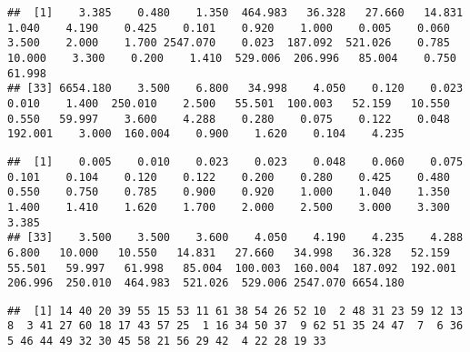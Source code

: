 \documentclass[
]{book}
\newenvironment{Shaded}{\begin{snugshade}}{\end{snugshade}}
\newcommand{\FunctionTok}[1]{\textcolor[rgb]{0.00,0.00,0.00}{#1}}
\newcommand{\NormalTok}[1]{#1}
\newcommand{\SpecialCharTok}[1]{\textcolor[rgb]{0.00,0.00,0.00}{#1}}
\begin{document}
\begin{Shaded}
\end{Shaded}

\begin{verbatim}
##  [1]    3.385    0.480    1.350  464.983   36.328   27.660   14.831    1.040    4.190    0.425    0.101    0.920    1.000    0.005    0.060    3.500    2.000    1.700 2547.070    0.023  187.092  521.026    0.785   10.000    3.300    0.200    1.410  529.006  206.996   85.004    0.750   61.998
## [33] 6654.180    3.500    6.800   34.998    4.050    0.120    0.023    0.010    1.400  250.010    2.500   55.501  100.003   52.159   10.550    0.550   59.997    3.600    4.288    0.280    0.075    0.122    0.048  192.001    3.000  160.004    0.900    1.620    0.104    4.235
\end{verbatim}

\begin{Shaded}
\end{Shaded}

\begin{verbatim}
##  [1]    0.005    0.010    0.023    0.023    0.048    0.060    0.075    0.101    0.104    0.120    0.122    0.200    0.280    0.425    0.480    0.550    0.750    0.785    0.900    0.920    1.000    1.040    1.350    1.400    1.410    1.620    1.700    2.000    2.500    3.000    3.300    3.385
## [33]    3.500    3.500    3.600    4.050    4.190    4.235    4.288    6.800   10.000   10.550   14.831   27.660   34.998   36.328   52.159   55.501   59.997   61.998   85.004  100.003  160.004  187.092  192.001  206.996  250.010  464.983  521.026  529.006 2547.070 6654.180
\end{verbatim}

\begin{Shaded}
\end{Shaded}

\begin{verbatim}
##  [1] 14 40 20 39 55 15 53 11 61 38 54 26 52 10  2 48 31 23 59 12 13  8  3 41 27 60 18 17 43 57 25  1 16 34 50 37  9 62 51 35 24 47  7  6 36  5 46 44 49 32 30 45 58 21 56 29 42  4 22 28 19 33
\end{verbatim}
\end{document}
